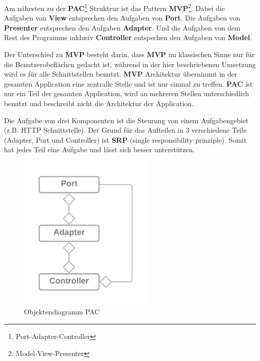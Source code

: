 Am nähesten zu der \textbf{PAC}\footnote{Port-Adapter-Controller} Struktrur 
ist das Pattern \textbf{MVP}\footnote{Model-View-Presenter}.
Dabei die Aufgaben von \textbf{View} entsprechen den Aufgaben von \textbf{Port}. 
Die Aufgaben von \textbf{Presenter} entsprechen den Aufgaben \textbf{Adapter}.
Und die Aufgaben von dem Rest des Programms inklusiv \textbf{Controller} entspechen den Aufgaben von \textbf{Model}.

Der Unterschied zu \textbf{MVP} besteht darin, dass \textbf{MVP} im klassischen Sinne nur für die Benutzerobeflächen gedacht ist,
während in der hier beschriebenen Umsetzung wird es für alle Schnittstellen benutzt.
\textbf{MVP} Architektur übernimmt in der gesamten Application eine zentralle Stelle und ist nur einmal zu treffen.
\textbf{PAC} ist nur ein Teil der gesamten Application, wird an mehreren Stellen unterschiedlich benutzt und beschreibt nicht 
die Architektur der Application.

Die Aufgabe von drei Komponenten ist die Steurung von einem Aufgabengebiet (z.B. HTTP Schnittstelle).
Der Grund für das Aufteilen in 3 verschiedene Teile (Adapter, Port und Controller) ist
\textbf{SRP} (single responsibility prinziple). Somit hat jedes Teil eine Aufgabe und lässt sich besser 
unterstützen. 


\begin{figure}[H]
   \centering
   \includegraphics[width=6.5cm]{./images/Port-Adapter-Contoller.png}
    \caption[Objektendiagramm PAC]{Objektendiagramm PAC \footnotemark}
    \label{fig:CDPAC}
\end{figure}
